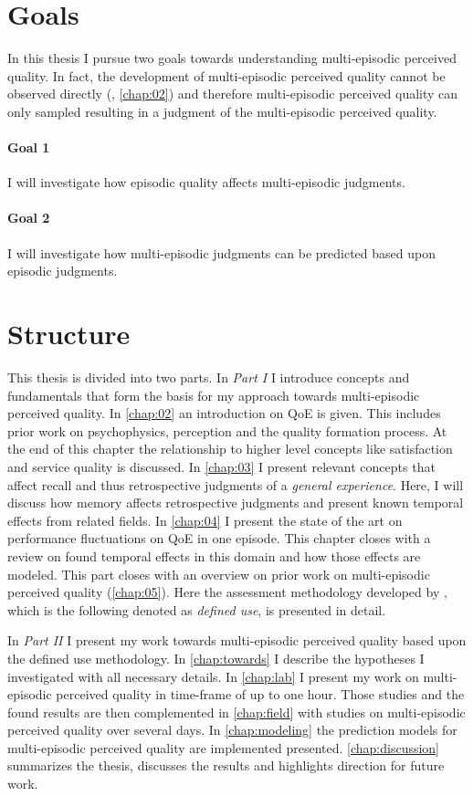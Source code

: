 \section{Goals}
In this thesis I pursue two goals towards understanding multi-episodic perceived quality.
In fact, the development of multi-episodic perceived quality cannot be observed directly (\cf, \autoref{chap:02}) and therefore multi-episodic perceived quality can only sampled resulting in a judgment of the multi-episodic perceived quality.

\paragraph*{Goal 1}
I will investigate how episodic quality affects multi-episodic judgments.

\paragraph*{Goal 2}
I will investigate how multi-episodic judgments can be predicted based upon episodic judgments.

\section{Structure}
This thesis is divided into two parts.
In \emph{Part I} I introduce concepts and fundamentals that form the basis for my approach towards multi-episodic perceived quality.
In \autoref{chap:02} an introduction on \ac{QoE} is given.
This includes prior work on psychophysics, perception and the quality formation process.
At the end of this chapter the relationship to higher level concepts like satisfaction and service quality is discussed.
In \autoref{chap:03} I present relevant concepts that affect recall and thus retrospective judgments of a \emph{general experience}.
Here, I will discuss how memory affects retrospective judgments and present known temporal effects from related fields.
In \autoref{chap:04} I present the state of the art on performance fluctuations on \ac{QoE} in one episode.
This chapter closes with a review on found temporal effects in this domain and how those effects are modeled.
This part closes with an overview on prior work on multi-episodic perceived quality (\autoref{chap:05}).
Here the assessment methodology developed by \cite{moller_single-call_2011}, which is the following denoted as \emph{defined use}, is presented in detail.

In \emph{Part II} I present my work towards multi-episodic perceived quality based upon the defined use methodology.
In \autoref{chap:towards} I describe the hypotheses I investigated with all necessary details.
In \autoref{chap:lab} I present my work on multi-episodic perceived quality in time-frame of up to one hour.
Those studies and the found results are then complemented in \autoref{chap:field} with studies on multi-episodic perceived quality over several days.
In \autoref{chap:modeling} the prediction models for multi-episodic perceived quality are implemented presented.
\autoref{chap:discussion} summarizes the thesis, discusses the results and highlights direction for future work.
